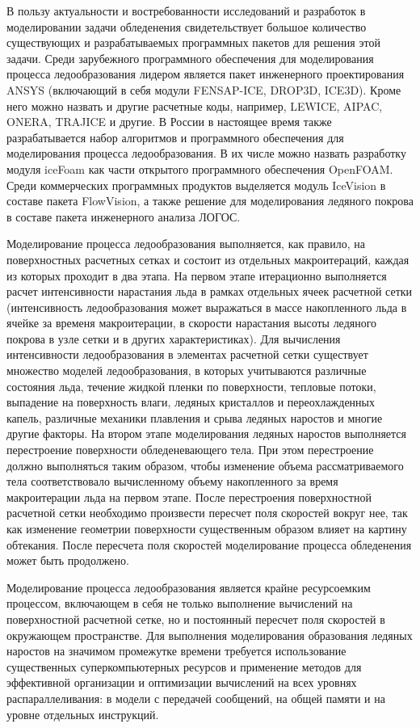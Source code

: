 \documentclass[a4paper,14pt]{extarticle}                     %
\theoremstyle{plain}                                         %
\begin{document}
В пользу актуальности и востребованности исследований и разработок в моделировании задачи обледенения свидетельствует большое количество существующих и разрабатываемых программных пакетов для решения этой задачи.
Среди зарубежного программного обеспечения для моделирования процесса ледообразования лидером является пакет инженерного проектирования ANSYS (включающий в себя модули FENSAP-ICE, DROP3D, ICE3D).
Кроме него можно назвать и другие расчетные коды, например, LEWICE, AIPAC, ONERA, TRAJICE и другие.
В России в настоящее время также разрабатывается набор алгоритмов и программного обеспечения для моделирования процесса ледообразования.
В их числе можно назвать разработку модуля iceFoam как части открытого программного обеспечения OpenFOAM.
Среди коммерческих программных продуктов выделяется модуль IceVision в составе пакета FlowVision, а также решение для моделирования ледяного покрова в составе пакета инженерного анализа ЛОГОС.

Моделирование процесса ледообразования выполняется, как правило, на поверхностных расчетных сетках и состоит из отдельных макроитераций, каждая из которых проходит в два этапа.
На первом этапе итерационно выполняется расчет интенсивности нарастания льда в рамках отдельных ячеек расчетной сетки (интенсивность ледообразования может выражаться в массе накопленного льда в ячейке за временя макроитерации, в скорости нарастания высоты ледяного покрова в узле сетки и в других характеристиках).
Для вычисления интенсивности ледообразования в элементах расчетной сетки существует множество моделей ледообразования, в которых учитываются различные состояния льда, течение жидкой пленки по поверхности, тепловые потоки, выпадение на поверхность влаги, ледяных кристаллов и переохлажденных капель, различные механики плавления и срыва ледяных наростов и многие другие факторы.
На втором этапе моделирования ледяных наростов выполняется перестроение поверхности обледеневающего тела.
При этом перестроение должно выполняться таким образом, чтобы изменение объема рассматриваемого тела соответствовало вычисленному объему накопленного за время макроитерации льда на первом этапе.
После перестроения поверхностной расчетной сетки необходимо произвести пересчет поля скоростей вокруг нее, так как изменение геометрии поверхности существенным образом влияет на картину обтекания.
После пересчета поля скоростей моделирование процесса обледенения может быть продолжено.

Моделирование процесса ледообразования является крайне ресурсоемким процессом, включающем в себя не только выполнение вычислений на поверхностной расчетной сетке, но и постоянный пересчет поля скоростей в окружающем пространстве.
Для выполнения моделирования образования ледяных наростов на значимом промежутке времени требуется использование существенных суперкомпьютерных ресурсов и применение методов для эффективной организации и оптимизации вычислений на всех уровнях распараллеливания: в модели с передачей сообщений, на общей памяти и на уровне отдельных инструкций.
\end{document}
